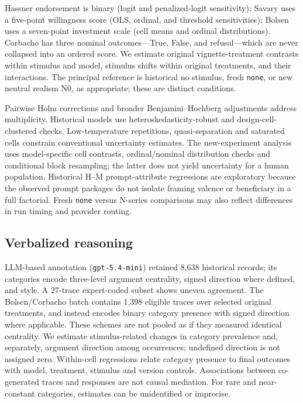 \documentclass[14pt,a4paper]{extarticle}
\begin{document}
Hassner endorsement is binary (logit and penalized-logit sensitivity); Savary uses a five-point willingness score (OLS, ordinal, and threshold sensitivities); Bolsen uses a seven-point investment scale (cell means and ordinal distributions). Corbacho has three nominal outcomes---True, False, and refusal---which are never collapsed into an ordered score. We estimate original vignette-treatment contrasts within stimulus and model, stimulus shifts within original treatments, and their interactions. The principal reference is historical no stimulus, fresh \texttt{none}, or new neutral realism N0, as appropriate; these are distinct conditions.

Pairwise Holm corrections and broader Benjamini--Hochberg adjustments address multiplicity. Historical models use heteroskedasticity-robust and design-cell-clustered checks. Low-temperature repetitions, quasi-separation and saturated cells constrain conventional uncertainty estimates. The new-experiment analysis uses model-specific cell contrasts, ordinal/nominal distribution checks and conditional block resampling; the latter does not yield uncertainty for a human population. Historical H--M prompt-attribute regressions are exploratory because the observed prompt packages do not isolate framing valence or beneficiary in a full factorial. Fresh \texttt{none} versus N-series comparisons may also reflect differences in run timing and provider routing.

\subsection{Verbalized reasoning}

LLM-based annotation (\texttt{gpt-5.4-mini}) retained 8,638 historical records; its categories encode three-level argument centrality, signed direction where defined, and style. A 27-trace expert-coded subset shows uneven agreement. The Bolsen/Corbacho batch contains 1,398 eligible traces over selected original treatments, and instead encodes binary category presence with signed direction where applicable. These schemes are not pooled as if they measured identical centrality. We estimate stimulus-related changes in category prevalence and, separately, argument direction among occurrences; undefined direction is not assigned zero. Within-cell regressions relate category presence to final outcomes with model, treatment, stimulus and version controls. Associations between co-generated traces and responses are not causal mediation. For rare and near-constant categories, estimates can be unidentified or imprecise.
\end{document}

